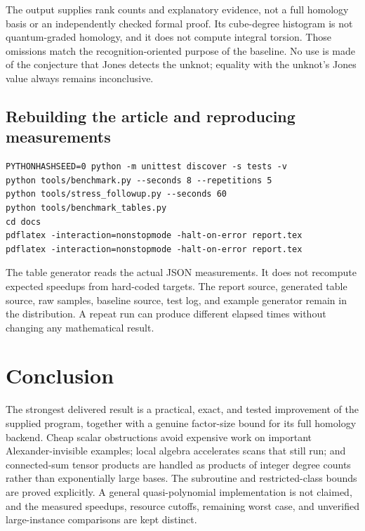 \documentclass[11pt,letterpaper]{article}
\theoremstyle{definition}
\begin{document}
The output supplies rank counts and explanatory evidence, not a full homology
basis or an independently checked formal proof. Its cube-degree histogram is
not quantum-graded homology, and it does not compute integral torsion. Those
omissions match the recognition-oriented purpose of the baseline. No use is
made of the conjecture that Jones detects the unknot; equality with the unknot's
Jones value always remains inconclusive.

\subsection{Rebuilding the article and reproducing measurements}
\par\medskip\noindent\begin{minipage}{\linewidth}
\begin{lstlisting}
PYTHONHASHSEED=0 python -m unittest discover -s tests -v
python tools/benchmark.py --seconds 8 --repetitions 5
python tools/stress_followup.py --seconds 60
python tools/benchmark_tables.py
cd docs
pdflatex -interaction=nonstopmode -halt-on-error report.tex
pdflatex -interaction=nonstopmode -halt-on-error report.tex
\end{lstlisting}
\end{minipage}\par\medskip
The table generator reads the actual JSON measurements. It does not recompute
expected speedups from hard-coded targets. The report source, generated table
source, raw samples, baseline source, test log, and example generator remain in
the distribution. A repeat run can produce different elapsed times without
changing any mathematical result.

\section{Conclusion}

The strongest delivered result is a practical, exact, and tested improvement
of the supplied program, together with a genuine factor-size bound for its full
homology backend. Cheap scalar obstructions avoid expensive work on important
Alexander-invisible examples; local algebra accelerates scans that still run;
and connected-sum tensor products are handled as products of integer degree
counts rather than exponentially large bases. The subroutine and restricted-class
bounds are proved explicitly. A general quasi-polynomial implementation is not
claimed, and the measured speedups, resource cutoffs, remaining worst case, and
unverified large-instance comparisons are kept distinct.
\end{document}
